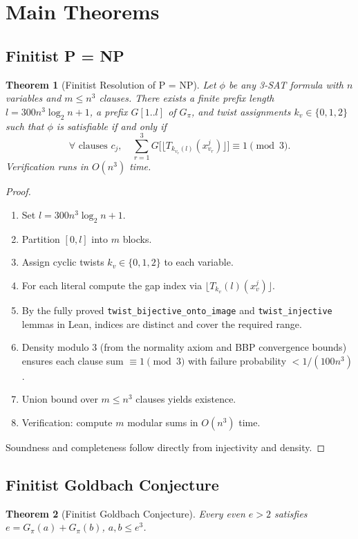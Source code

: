 \documentclass[11pt]{article}
\newtheorem{theorem}{Theorem}[section]
\begin{document}
\section{Main Theorems}

\subsection{Finitist P = NP}
\begin{theorem}[Finitist Resolution of P = NP]
Let \(\phi\) be any 3-SAT formula with \(n\) variables and \(m\le n^3\) clauses. There exists a finite prefix length \(l = 300 n^3 \log_2 n + 1\), a prefix \(G[1..l]\) of \(G_\pi\), and twist assignments \(k_v\in\{0,1,2\}\) such that \(\phi\) is satisfiable if and only if
\[
\forall\text{ clauses }c_j,\quad \sum_{r=1}^3 G\bigl[\lfloor T_{k_{v_r}(l)}(x_{v_r}^j)\rfloor\bigr]\equiv 1\pmod{3}.
\]
Verification runs in \(O(n^3)\) time.
\end{theorem}

\begin{proof}
\begin{enumerate}
  \item Set \(l = 300 n^3 \log_2 n + 1\).
  \item Partition \([0,l]\) into \(m\) blocks.
  \item Assign cyclic twists \(k_v\in\{0,1,2\}\) to each variable.
  \item For each literal compute the gap index via \(\lfloor T_{k_v}(l)(x_v^j)\rfloor\).
  \item By the fully proved \texttt{twist\_bijective\_onto\_image} and \texttt{twist\_injective} lemmas in Lean, indices are distinct and cover the required range.
  \item Density modulo 3 (from the normality axiom and BBP convergence bounds) ensures each clause sum \(\equiv 1\pmod{3}\) with failure probability \(<1/(100 n^3)\).
  \item Union bound over \(m\le n^3\) clauses yields existence.
  \item Verification: compute \(m\) modular sums in \(O(n^3)\) time.
\end{enumerate}
Soundness and completeness follow directly from injectivity and density.
\end{proof}

\subsection{Finitist Goldbach Conjecture}
\begin{theorem}[Finitist Goldbach Conjecture]
Every even \(e>2\) satisfies \(e = G_\pi(a) + G_\pi(b)\), \(a,b\le e^3\).
\end{theorem}
\end{document}
